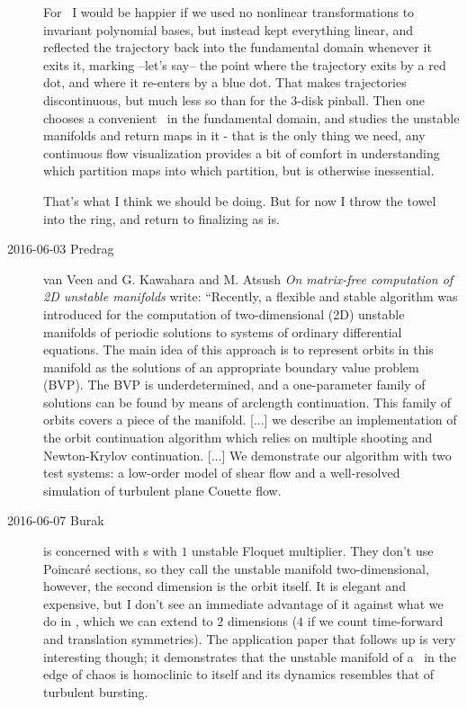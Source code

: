 \begin{description}
For \KS\ I would be happier if we used no nonlinear transformations to
invariant polynomial bases, but instead kept everything linear, and
reflected the trajectory back into the fundamental domain whenever it
exits it, marking --let's say-- the point where the trajectory exits by a
red dot, and where it re-enters by a blue dot. That makes trajectories
discontinuous, but much less so than for the 3-disk pinball. Then one
chooses a convenient \PoincSec\ in the fundamental domain, and studies
the unstable manifolds and return maps in it - that is the only thing we
need, any continuous flow visualization provides a bit of  comfort in
understanding which partition maps into which partition, but is otherwise
inessential.

That's what I think we should be doing. But for now I throw the towel into
the ring, and return to finalizing  as is.

\item[2016-06-03 Predrag]
van Veen and G. Kawahara and M. Atsush
{\em On matrix-free computation of {2D} unstable manifolds} write:
``Recently, a flexible and stable algorithm was introduced for the
computation of two-dimensional (2D) unstable manifolds of periodic
solutions to systems of ordinary differential equations. The main idea of
this approach is to represent orbits in this manifold as the solutions of
an appropriate boundary value problem (BVP). The BVP is underdetermined,
and a one-parameter family of solutions can be found by means of
arclength continuation. This family of orbits covers a piece of the
manifold.
[...]
we describe an implementation of the orbit continuation algorithm which
relies on multiple shooting and Newton-Krylov continuation.
[...]
We demonstrate our algorithm with two test systems: a low-order model of
shear flow and a well-resolved simulation of turbulent plane Couette
flow.

\item[2016-06-07 Burak]  is concerned with \po s with
$1$ unstable Floquet multiplier. They don't use Poincar\'e sections, so
they call the unstable manifold two-dimensional, however, the second
dimension is the orbit itself. It is elegant
and expensive, but I don't see an immediate advantage of it against what
we do in , which we can extend to $2$ dimensions ($4$
if we count time-forward and translation symmetries). The application
paper  that follows up is very interesting though; it
demonstrates that the unstable manifold of a \po\ in the edge of chaos
is homoclinic to itself and its dynamics resembles that of turbulent
bursting.


\end{description}
